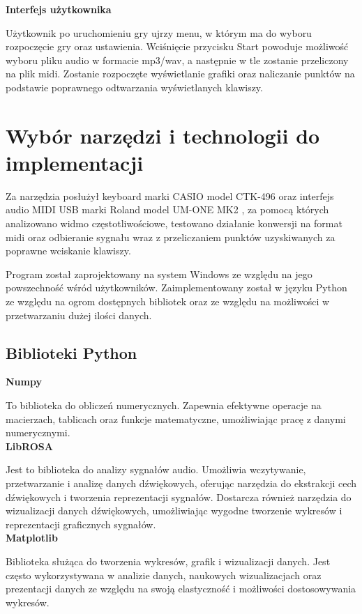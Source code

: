 \noindent\textbf{Interfejs użytkownika}

Użytkownik po uruchomieniu gry ujrzy menu, w którym ma do wyboru rozpoczęcie gry oraz ustawienia. Wciśnięcie przycisku Start powoduje możliwość wyboru pliku audio w formacie mp3/wav, a następnie w tle zostanie przeliczony na plik midi. Zostanie rozpoczęte wyświetlanie grafiki oraz naliczanie punktów na podstawie poprawnego odtwarzania wyświetlanych klawiszy.

\section{Wybór narzędzi i technologii do implementacji}

Za narzędzia posłużył keyboard marki CASIO model CTK-496 \cite{casio_ctk496} oraz interfejs audio MIDI USB marki Roland model UM-ONE MK2 \cite{roland_um_one}, za pomocą których analizowano widmo częstotliwościowe, testowano działanie konwersji na format midi oraz odbieranie sygnału wraz z przeliczaniem punktów uzyskiwanych za poprawne wciskanie klawiszy.

Program został zaprojektowany na system Windows ze względu na jego powszechność wśród użytkowników. Zaimplementowany został w języku Python\cite{python} ze względu na ogrom dostępnych bibliotek oraz ze względu na możliwości w przetwarzaniu dużej ilości danych.

\subsection{Biblioteki Python}

\noindent\textbf{Numpy}\cite{numpy}

To biblioteka do obliczeń numerycznych. Zapewnia efektywne operacje na macierzach, tablicach oraz funkcje matematyczne, umożliwiając pracę z danymi numerycznymi.\\

\noindent\textbf{LibROSA}\cite{librosa}

Jest to biblioteka do analizy sygnałów audio. Umożliwia wczytywanie, przetwarzanie i analizę danych dźwiękowych, oferując narzędzia do ekstrakcji cech dźwiękowych i tworzenia reprezentacji sygnałów. Dostarcza również narzędzia do wizualizacji danych dźwiękowych, umożliwiając wygodne tworzenie wykresów i reprezentacji graficznych sygnałów.\\

\noindent\textbf{Matplotlib}\cite{matplotlib}

Biblioteka służąca do tworzenia wykresów, grafik i wizualizacji danych. Jest często wykorzystywana w analizie danych, naukowych wizualizacjach oraz prezentacji danych ze względu na swoją elastyczność i możliwości dostosowywania wykresów.\\

